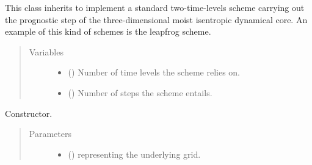 \documentclass[letterpaper,10pt,english]{sphinxmanual}
\begin{document}

\begin{fulllineitems}
\label{\detokenize{api:dycore.prognostic_isentropic.PrognosticIsentropicTL2}}
This class inherits {\hyperref[\detokenize{api:dycore.prognostic_isentropic.PrognosticIsentropic}]{}} to
implement a standard two-time-levels scheme carrying out the prognostic step of the three-dimensional
moist isentropic dynamical core. An example of this kind of schemes is the leapfrog scheme.
\begin{quote}\begin{description}
\item[{Variables}] \leavevmode\begin{itemize}
\item {} 
 () \textendash{} Number of time levels the scheme relies on.

\item {} 
 () \textendash{} Number of steps the scheme entails.

\end{itemize}

\end{description}\end{quote}

\begin{fulllineitems}
\label{\detokenize{api:dycore.prognostic_isentropic.PrognosticIsentropicTL2.__init__}}
Constructor.
\begin{quote}\begin{description}
\item[{Parameters}] \leavevmode\begin{itemize}
\item {} 
 () \textendash{} {\hyperref[\detokenize{api:grids.grid_xyz.GridXYZ}]{}} representing the underlying grid.


\end{itemize}
\end{description}
\end{quote}
\end{fulllineitems}
\end{fulllineitems}
\end{document}
